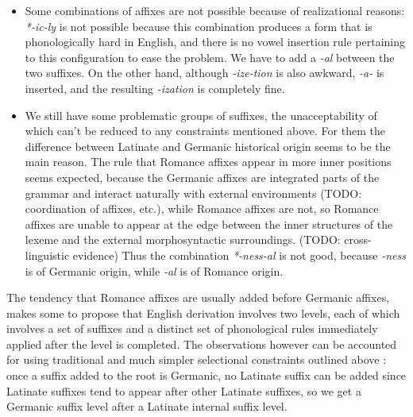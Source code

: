 \documentclass[UTF8, a4paper, oneside, scheme=plain, 12pt]{ctexbook}
\newcommand{\form}[1]{\emph{#1}}
\begin{document}
\begin{itemize}
    \item Some combinations of affixes are not possible because of realizational reasons:
    \form{*-ic-ly} is not possible 
    because this combination produces a form 
    that is phonologically hard in English,
    and there is no vowel insertion rule pertaining to this configuration to ease the problem.
    We have to add a \form{-al} between the two suffixes.
    On the other hand, although \form{-ize-tion} is also awkward,
    \form{-a-} is inserted, and the resulting \form{-ization} is completely fine.
    \item We still have some problematic groups of suffixes,
    the unacceptability of which can't be reduced to any constraints mentioned above.
    For them the difference
    between Latinate and Germanic historical origin 
    seems to be the main reason.
    The rule that Romance affixes appear in more inner positions seems expected,
    because the Germanic affixes are integrated parts of the grammar 
    and interact naturally with external environments
    (TODO: coordination of affixes, etc.),
    while Romance affixes are not,
    so Romance affixes are unable to appear at the edge 
    between the inner structures of the lexeme and the external morphosyntactic surroundings.
    (TODO: cross-linguistic evidence)
    Thus the combination \form{*-ness-al} is not good,
    because \form{-ness} is of Germanic origin,
    while \form{-al} is of Romance origin.
\end{itemize}

The tendency that Romance affixes are usually added before Germanic affixes,
makes some to propose that English derivation 
involves two levels, 
each of which involves a set of suffixes 
and a distinct set of phonological rules immediately applied after the level is completed.
The observations however can be accounted for 
using traditional and much simpler selectional constraints outlined above \citep{fabb1988english}:
once a suffix added to the root is Germanic,
no Latinate suffix can be added 
since Latinate suffixes tend to appear after other Latinate suffixes,
so we get a Germanic suffix level after a Latinate internal suffix level.
\end{document}
